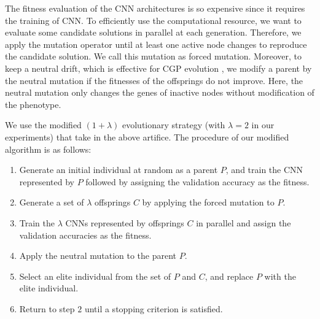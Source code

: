 The fitness evaluation of the CNN architectures is so expensive since it requires the training of CNN.
To efficiently use the computational resource, we want to evaluate some candidate solutions in parallel at each generation.
Therefore, we apply the mutation operator until at least one active node changes to reproduce the candidate solution. We call this mutation as forced mutation.
Moreover, to keep a neutral drift, which is effective for CGP evolution \todo{\cite{}}, we modify a parent by the neutral mutation if the fitnesses of the offsprings do not improve.
Here, the neutral mutation only changes the genes of inactive nodes without modification of the phenotype.

We use the modified $(1+\lambda)$ evolutionary strategy (with $\lambda = 2$ in our experiments) that take in the above artifice.
The procedure of our modified algorithm is as follows:
\begin{enumerate}
  \item Generate an initial individual at random as a parent $P$, and train the CNN represented by $P$ followed by assigning the validation accuracy as the fitness.
  \item Generate a set of $\lambda$ offsprings $C$ by applying the forced mutation to $P$.
  \item Train the $\lambda$ CNNs represented by offsprings $C$ in parallel and assign the validation accuracies as the fitness.
  \item Apply the neutral mutation to the parent $P$.
  \item Select an elite individual from the set of $P$ and $C$, and replace $P$ with the elite individual.
  \item Return to step $2$ until a stopping criterion is satisfied.
\end{enumerate}

